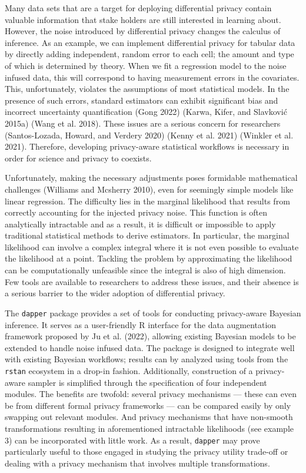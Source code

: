 Many data sets that are a target for deploying differential privacy contain
valuable information that stake holders are still interested in
learning about. However, the noise introduced by differential privacy
changes the calculus of inference. As an example,
we can implement differential privacy for tabular data by directly
adding independent, random error to each cell; the amount and type of which is determined by theory. When we fit a regression model to the noise infused data,
this will correspond to having measurement errors
in the covariates. This, unfortunately, violates the assumptions of most statistical models.
In the presence of such errors, standard estimators can exhibit significant bias and incorrect uncertainty quantification
(Gong 2022) (Karwa, Kifer, and Slavković 2015a) (Wang et al. 2018).
These issues are a serious concern for researchers (Santos-Lozada, Howard, and Verdery 2020) (Kenny et al. 2021) (Winkler et al. 2021).
Therefore, developing privacy-aware statistical workflows is necessary in order
for science and privacy to coexists.

Unfortunately, making the necessary adjustments poses formidable mathematical
challenges (Williams and Mcsherry 2010), even for seemingly simple models like linear regression.
The difficulty lies in the marginal likelihood that results from correctly accounting for the injected
privacy noise. This function is often analytically intractable and as a result,
it is difficult or impossible to apply traditional statistical methods
to derive estimators. In particular, the marginal likelihood can involve a complex
integral where it is not even possible to evaluate the likelihood
at a point. Tackling the problem by approximating the likelihood can be computationally
unfeasible since the integral is also of high dimension.
Few tools are available to researchers to address these issues,
and their absence is a serious barrier to the wider adoption
of differential privacy.

The \texttt{dapper} package provides a set of tools for conducting
privacy-aware Bayesian inference. It serves as a user-friendly R
interface for the data augmentation framework proposed by Ju et al. (2022),
allowing existing Bayesian models to be extended to handle
noise infused data. The package is designed to integrate well with existing Bayesian workflows;
results can by analyzed using tools from the \texttt{rstan} ecosystem in a drop-in fashion. Additionally,
construction of a privacy-aware sampler is simplified
through the specification of four independent modules.
The benefits are twofold: several privacy mechanisms --- these can even be from different formal privacy frameworks ---
can be compared easily by only swapping out relevant modules. And privacy mechanisms
that have non-smooth transformations resulting in aforementioned intractable likelihoods
(see example 3) can be incorporated with little work. As a result,
\texttt{dapper} may prove particularly useful to those engaged in studying the privacy utility trade-off or dealing with a privacy mechanism that involves multiple transformations.

